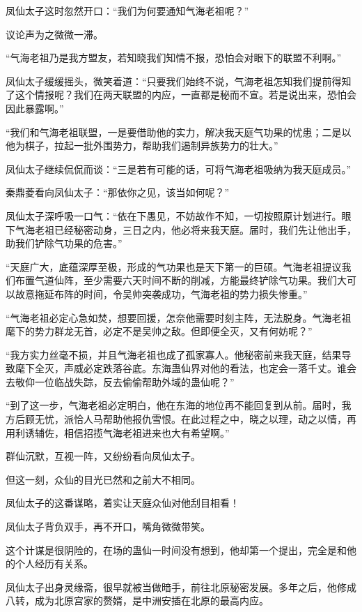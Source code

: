 \begin{this_body}
凤仙太子这时忽然开口：“我们为何要通知气海老祖呢？”

议论声为之微微一滞。

“气海老祖乃是我方盟友，若知晓我们知情不报，恐怕会对眼下的联盟不利啊。”

凤仙太子缓缓摇头，微笑着道：“只要我们始终不说，气海老祖怎知我们提前得知了这个情报呢？我们在两天联盟的内应，一直都是秘而不宣。若是说出来，恐怕会因此暴露啊。”

“我们和气海老祖联盟，一是要借助他的实力，解决我天庭气功果的忧患；二是以他为棋子，拉起一批外围势力，帮助我们遏制异族势力的壮大。”

凤仙太子继续侃侃而谈：“三是若有可能的话，可将气海老祖吸纳为我天庭成员。”

秦鼎菱看向凤仙太子：“那依你之见，该当如何呢？”

凤仙太子深呼吸一口气：“依在下愚见，不妨故作不知，一切按照原计划进行。眼下气海老祖已经秘密动身，三日之内，他必将来我天庭。届时，我们先让他出手，助我们铲除气功果的危害。”

“天庭广大，底蕴深厚至极，形成的气功果也是天下第一的巨硕。气海老祖提议我们布置气道仙阵，至少需要六天时间不断的削减，方能最终铲除气功果。我们大可以故意拖延布阵的时间，令吴帅突袭成功，气海老祖的势力损失惨重。”

“气海老祖必定心急如焚，想要回援，怎奈他需要时刻主阵，无法脱身。气海老祖麾下的势力群龙无首，必定不是吴帅之敌。但即便全灭，又有何妨呢？”

“我方实力丝毫不损，并且气海老祖也成了孤家寡人。他秘密前来我天庭，结果导致麾下全灭，声威必定跌落谷底。东海蛊仙界对他的看法，也定会一落千丈。谁会去敬仰一位临战失踪，反去偷偷帮助外域的蛊仙呢？”

“到了这一步，气海老祖必定明白，他在东海的地位再不能回复到从前。届时，我方后顾无忧，派恰人马帮助他报仇雪恨。在此过程之中，晓之以理，动之以情，再用利诱辅佐，相信招揽气海老祖进来也大有希望啊。”

群仙沉默，互视一阵，又纷纷看向凤仙太子。

但这一刻，众仙的目光已然和之前大不相同。

凤仙太子的这番谋略，着实让天庭众仙对他刮目相看！

凤仙太子背负双手，再不开口，嘴角微微带笑。

这个计谋是很阴险的，在场的蛊仙一时间没有想到，他却第一个提出，完全是和他的个人经历有关系。

凤仙太子出身灵缘斋，很早就被当做暗手，前往北原秘密发展。多年之后，他修成八转，成为北原宫家的赘婿，是中洲安插在北原的最高内应。


\end{this_body}
